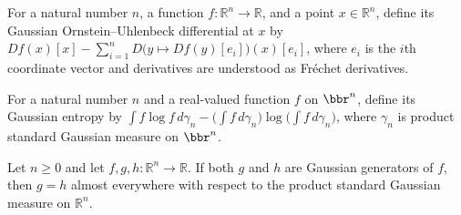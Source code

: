 \begin{definition}
\label{BooleanAnalysis.GaussianSpace.gaussianOUDifferential}
\leanok
For a natural number $n$, a function $f:\mathbb{R}^n\to\mathbb{R}$, and a point
$x\in\mathbb{R}^n$, define its Gaussian Ornstein–Uhlenbeck differential at $x$ by
$Df(x)[x]-\sum_{i=1}^n D\bigl(y\mapsto Df(y)[e_i]\bigr)(x)[e_i]$, where $e_i$ is the
$i$th coordinate vector and derivatives are understood as Fréchet derivatives.
\end{definition}

\begin{definition}
\label{BooleanAnalysis.GaussianSpace.gaussianEntropy}
\leanok
{}
For a natural number $n$ and a real-valued function $f$ on $\bbr^n$, define its Gaussian
entropy by $\int f\log f\,d\gamma_n-\bigl(\int f\,d\gamma_n\bigr)\log\bigl(\int
f\,d\gamma_n\bigr)$, where $\gamma_n$ is product standard Gaussian measure on $\bbr^n$.
\end{definition}

\begin{theorem}
\label{BooleanAnalysis.GaussianSpace.gaussianGenerator_unique}
\leanok
{}
Let $n\ge0$ and let $f,g,h:\mathbb R^n\to\mathbb R$. If both $g$ and $h$ are Gaussian
generators of $f$, then $g=h$ almost everywhere with respect to the product standard
Gaussian measure on $\mathbb R^n$.
\end{theorem}

